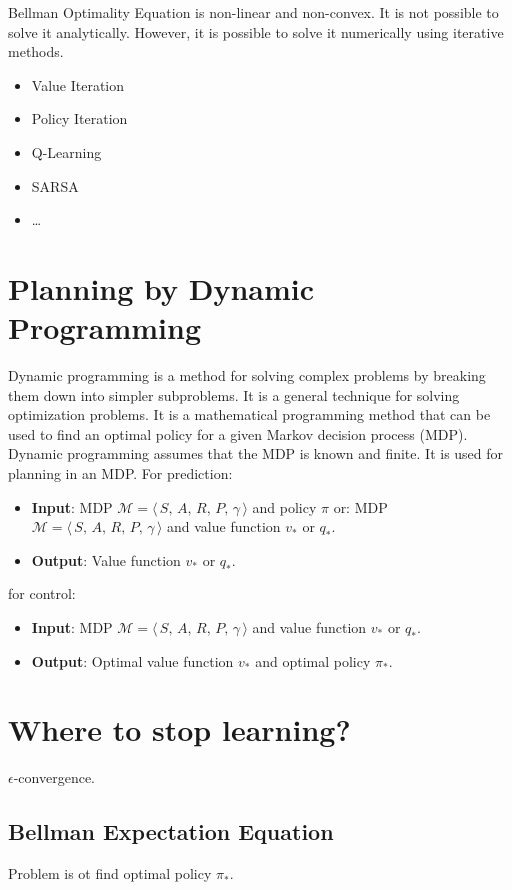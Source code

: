 \begin{itemize}
Bellman Optimality Equation is non-linear and non-convex.
It is not possible to solve it analytically.
However, it is possible to solve it numerically using iterative methods.
\begin{itemize}
    \item Value Iteration
    \item Policy Iteration
    \item Q-Learning
    \item SARSA
    \item \ldots
\end{itemize}


\section{Planning by Dynamic Programming}\label{sec:planning-by-dynamic-programming}
Dynamic programming is a method for solving complex problems by breaking them down into simpler subproblems.
It is a general technique for solving optimization problems.
It is a mathematical programming method that can be used to find an optimal policy for a given Markov decision process (MDP).
Dynamic programming assumes that the MDP is known and finite.
It is used for planning in an MDP.
For prediction:
\begin{itemize}
    \item \textbf{Input}: MDP $\mathcal{M} = \langle\,S,\,A,\,R,\,P,\,\gamma\,\rangle$ and policy $\pi$
    or: MDP $\mathcal{M} = \langle\,S,\,A,\,R,\,P,\,\gamma\,\rangle$ and value function $v_*$ or $q_*$.
    \item \textbf{Output}: Value function $v_*$ or $q_*$.
\end{itemize}

for control:
\begin{itemize}
    \item \textbf{Input}: MDP $\mathcal{M} = \langle\,S,\,A,\,R,\,P,\,\gamma\,\rangle$ and value function $v_*$ or $q_*$.
    \item \textbf{Output}: Optimal value function $v_*$ and optimal policy $\pi_*$.
\end{itemize}


\section{Where to stop learning?}\label{sec:where-to-stop-learning}
$\epsilon$-convergence.

\subsection{Bellman Expectation Equation}\label{sec:bellman-expectation-equation} %
Problem is ot find optimal policy $\pi_*$.


\end{itemize}
